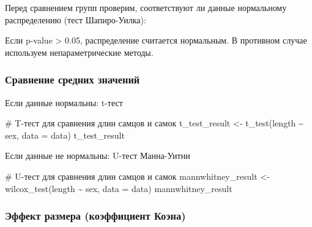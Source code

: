 \documentclass[
  letterpaper,
  DIV=11,
  numbers=noendperiod]{scrreprt}
\newenvironment{Shaded}{\begin{snugshade}}{\end{snugshade}}
\newcommand{\AttributeTok}[1]{\textcolor[rgb]{0.40,0.45,0.13}{#1}}
\newcommand{\CommentTok}[1]{\textcolor[rgb]{0.37,0.37,0.37}{#1}}
\newcommand{\FunctionTok}[1]{\textcolor[rgb]{0.28,0.35,0.67}{#1}}
\newcommand{\NormalTok}[1]{\textcolor[rgb]{0.00,0.23,0.31}{#1}}
\newcommand{\OtherTok}[1]{\textcolor[rgb]{0.00,0.23,0.31}{#1}}
\newcommand{\SpecialCharTok}[1]{\textcolor[rgb]{0.37,0.37,0.37}{#1}}
\begin{document}
Перед сравнением групп проверим, соответствуют ли данные нормальному
распределению (тест Шапиро-Уилка):

\begin{Shaded}
\end{Shaded}

Если p-value \textgreater{} 0.05, распределение считается нормальным. В
противном случае используем непараметрические методы.

\subsubsection{Сравнение средних
значений}\label{ux441ux440ux430ux432ux43dux435ux43dux438ux435-ux441ux440ux435ux434ux43dux438ux445-ux437ux43dux430ux447ux435ux43dux438ux439}

Если данные нормальны: t-тест

\begin{Shaded}
\begin{Highlighting}[]
\CommentTok{\# T{-}тест для сравнения длин самцов и самок  }
\NormalTok{t\_test\_result }\OtherTok{\textless{}{-}} \FunctionTok{t\_test}\NormalTok{(length }\SpecialCharTok{\textasciitilde{}}\NormalTok{ sex, }\AttributeTok{data =}\NormalTok{ data)  }
\NormalTok{t\_test\_result }
\end{Highlighting}
\end{Shaded}

Если данные не нормальны: U-тест Манна-Уитни

\begin{Shaded}
\begin{Highlighting}[]
\CommentTok{\# U{-}тест для сравнения длин самцов и самок  }
\NormalTok{mannwhitney\_result }\OtherTok{\textless{}{-}} \FunctionTok{wilcox\_test}\NormalTok{(length }\SpecialCharTok{\textasciitilde{}}\NormalTok{ sex, }\AttributeTok{data =}\NormalTok{ data)  }
\NormalTok{mannwhitney\_result }
\end{Highlighting}
\end{Shaded}

\subsubsection{Эффект размера (коэффициент
Коэна)}\label{ux44dux444ux444ux435ux43aux442-ux440ux430ux437ux43cux435ux440ux430-ux43aux43eux44dux444ux444ux438ux446ux438ux435ux43dux442-ux43aux43eux44dux43dux430}
\end{document}
